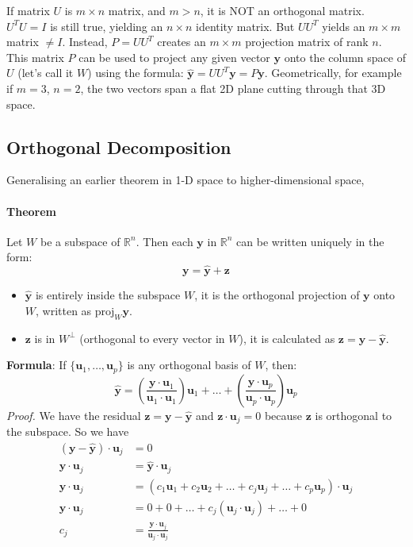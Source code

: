 \documentclass[../linear-algebra.tex]{subfiles}
\begin{document}
\medskip
\noindent If matrix $U$ is $m \times n$ matrix, and $m > n$, it is NOT an orthogonal matrix.\newline
$U^T U = I$ is still true, yielding an $n \times n$ identity matrix.\newline
But $U U^T$ yields an $m \times m$ matrix $\neq I$.
Instead, $P = U U^T$ creates an $m \times m$ projection matrix of rank $n$.
This matrix $P$ can be used to project any given vector $\mathbf{y}$ onto the column space of $U$ (let's call it $W$) using the formula: $\hat{\mathbf{y}} = U U^T \mathbf{y} = P\mathbf{y}$.
Geometrically, for example if $m=3$, $n=2$, the two vectors span a flat 2D plane cutting through that 3D space.

\subsection{Orthogonal Decomposition}
Generalising an earlier theorem in 1-D space to higher-dimensional space,
\paragraph{Theorem} Let $W$ be a subspace of $\mathbb{R}^n$. Then each $\mathbf{y}$ in $\mathbb{R}^n$ can be written uniquely in the form:
$$\mathbf{y} = \hat{\mathbf{y}} + \mathbf{z}$$
\begin{itemize}
    \item $\hat{\mathbf{y}}$ is entirely inside the subspace $W$, it is the orthogonal projection of $\mathbf{y}$ onto $W$, written as $\text{proj}_W \mathbf{y}$.
    \item $\mathbf{z}$ is in $W^\perp$ (orthogonal to every vector in $W$), it is calculated as $\mathbf{z} = \mathbf{y} - \hat{\mathbf{y}}$.
\end{itemize}
\textbf{Formula}: If $\{\mathbf{u}_1, \dots, \mathbf{u}_p\}$ is any orthogonal basis of $W$, then:
$$\hat{\mathbf{y}} = \left(\frac{\mathbf{y} \cdot \mathbf{u}_1}{\mathbf{u}_1 \cdot \mathbf{u}_1}\right)\mathbf{u}_1 + \dots + \left(\frac{\mathbf{y} \cdot \mathbf{u}_p}{\mathbf{u}_p \cdot \mathbf{u}_p}\right)\mathbf{u}_p$$
\textit{Proof.} We have the residual $\mathbf{z} = \mathbf{y} - \hat{\mathbf{y}}$ and $\mathbf{z} \cdot \mathbf{u}_j = 0$ because $\mathbf{z}$ is orthogonal to the subspace. So we have
\begin{align*}
    (\mathbf{y} - \hat{\mathbf{y}}) \cdot \mathbf{u}_j &= 0\\
    \mathbf{y} \cdot \mathbf{u}_j &= \hat{\mathbf{y}} \cdot \mathbf{u}_j\\
    \mathbf{y} \cdot \mathbf{u}_j &= (c_1\mathbf{u}_1 + c_2\mathbf{u}_2 + \dots + c_j\mathbf{u}_j + \dots + c_p\mathbf{u}_p) \cdot \mathbf{u}_j\\
    \mathbf{y} \cdot \mathbf{u}_j &= 0 + 0 + \dots + c_j(\mathbf{u}_j \cdot \mathbf{u}_j) + \dots + 0\\
    c_j &= \frac{\mathbf{y} \cdot \mathbf{u}_j}{\mathbf{u}_j \cdot \mathbf{u}_j}
\end{align*}
\end{document}
